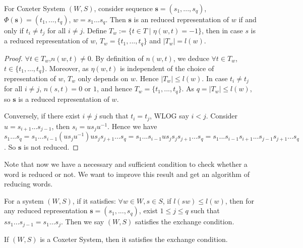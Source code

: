\begin{theorem} \label{thm:charofreduced}
    For Coxeter System $(W,S)$, consider sequence $\mathbf{s}=(s_1,...,s_q)$, $\Phi(\mathbf{s})=(t_1,...,t_q)$, $w=s_1...s_q$. Then $\mathbf{s}$ is an reduced representation of $w$ if and only if $t_i \ne t_j$ for all $i \ne j$. Define $T_w:=\{t \in T \mid \eta(w,t)=-1\}$, then in case $s$ is a reduced representation of $w$, $T_w=\{t_1,...,t_q\}$ and $|T_w|=l(w)$.
\end{theorem} 


\begin{proof}
    $\forall t \in T_w$,$n(w,t)\ne0$. By definition of $n(w,t)$, we deduce $\forall t \in T_w$,$t\in\{t_1,...,t_q\}$. Moreover, as $\eta(w,t)$ is independent of the choice of representation of $w$, $T_w$ only depends on $w$. Hence $|T_w|\le l(w)$. In case $t_i \ne t_j$ for all $i\ne j$, $n(s,t)=0$ or $1$, and hence $T_w=\{t_1,...,t_q\}$. As $q=|T_w| \le l(w)$, so $\mathbf{s}$ is a reduced representation of $w$. 

Conversely, if there exist $i \ne j$ such that $t_i=t_j$, WLOG say $i < j$. Consider $u=s_{i+1}...s_{j-1}$, then $s_i=us_ju^{-1}$. Hence we have $s_1...s_q=s_1...s_{i-1}(us_ju^{-1})us_js_{j+1}...s_q=s_1...s_{i-1}us_js_js_{j+1}...s_q=s_1...s_{i-1}s_{i+1}...s_{j-1}s_{j+1}...s_q$. So $\mathbf{s}$ is not reduced.
\end{proof} 


Note that now we have a necessary and sufficient condition to check whether a word is reduced or not. We want to improve this result and get an algorithm of reducing words. 


\begin{definition}
    For a system $(W,S)$, if it satisfies: $\forall w \in W,s\in S$, if $l(sw) \le l(w)$, then for any reduced representation $\mathbf{s}=(s_1,...,s_q)$, exist $1\le j \le q$ such that $ss_1...s_{j-1}=s_1...s_j$. Then we say $(W,S)$ satisfies the exchange condition.
\end{definition} 


\begin{theorem}\label{thm:exchange}
    If $(W,S)$ is a Coxeter System, then it satisfies the exchange condition. 

\end{theorem} 

